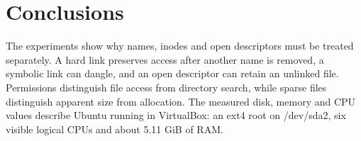 \chapter{Conclusions}

The experiments show why names, inodes and open descriptors must be treated separately. A hard link preserves access after another name is removed, a symbolic link can dangle, and an open descriptor can retain an unlinked file. Permissions distinguish file access from directory search, while sparse files distinguish apparent size from allocation. The measured disk, memory and CPU values describe Ubuntu running in VirtualBox: an ext4 root on /dev/sda2, six visible logical CPUs and about 5.11 GiB of RAM.
